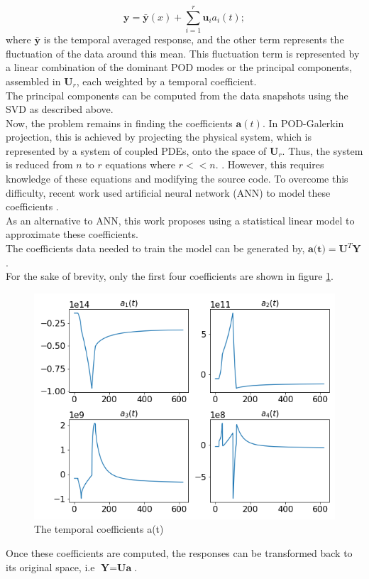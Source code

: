 \documentclass{anstrans}
\begin{document}
\begin{equation}
\textbf{y} = \bar{\textbf{y}}(x) + \sum_{i=1}^r \textbf{u}_i a_i(t);
\label{pod-galerkin}
\end{equation}
where $\bar{\textbf{y}}$ is the temporal averaged response, and the other term represents the fluctuation of the data around this mean. This fluctuation term is represented by a linear combination of the dominant POD modes or the principal components, assembled in $\textbf{U}_r$, each weighted by a temporal coefficient.\\
The principal components can be computed from the data snapshots using the SVD as described above.\\
 Now, the problem remains in finding the coefficients $\textbf{a}(t)$.
In POD-Galerkin projection, this is achieved by projecting the physical system, which is represented by a system of coupled PDEs, onto the space of $\textbf{U}_r$. Thus, the system is reduced from $n$ to $r$ equations where $r << n$. .
However, this requires knowledge of these equations and modifying the source code. To overcome this difficulty, recent work used artificial neural network (ANN) to model these coefficients \cite{san2019artificia}.\\
As an alternative to ANN, this work proposes using a statistical linear model to approximate these coefficients.\\
The coefficients data needed to train the model can be generated by, $\textbf{a(t)} = \textbf{U}^T \textbf{Y}$.\\
For the sake of brevity, only the first four coefficients are shown in figure \ref{fig:coeffs}.\\
\begin{figure}[h!]
	\centering
	\includegraphics[scale=0.4]{./figs/temp_coeff.png}
	\caption{The temporal coefficients a(t)}
	\label{fig:coeffs}
\end{figure}
Once these coefficients are computed, the responses can be transformed back to its original space, i.e $\textbf{Y} = \textbf{U} \textbf{a}$.
\end{document}
